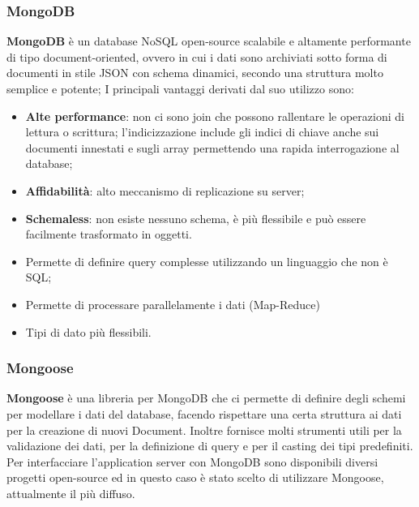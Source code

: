 \subsubsection{MongoDB}
\textbf{MongoDB} è un database NoSQL open-source scalabile e altamente performante di tipo document-oriented, ovvero in cui i dati sono archiviati sotto forma di documenti in stile JSON con schema dinamici, secondo una struttura molto semplice e potente;
I principali vantaggi derivati dal suo utilizzo sono:
\begin{itemize}
	\item \textbf{Alte performance}: non ci sono join che possono rallentare le operazioni di lettura o scrittura; l’indicizzazione include gli indici di chiave anche sui documenti innestati e sugli array permettendo una rapida interrogazione al database;
	\item \textbf{Affidabilità}: alto meccanismo di replicazione su server;
	\item \textbf{Schemaless}: non esiste nessuno schema, è più flessibile e può essere facilmente trasformato in oggetti.	
	\item Permette di definire query complesse utilizzando un linguaggio che non è SQL;
	\item Permette di processare parallelamente i dati (Map-Reduce)
	\item Tipi di dato più flessibili.
\end{itemize}

\subsubsection{Mongoose}
\textbf{Mongoose} è una libreria per MongoDB che ci permette di definire degli schemi per modellare i dati del database, facendo rispettare una certa struttura ai dati per la creazione di nuovi Document. Inoltre fornisce molti strumenti utili per la validazione dei dati, per la definizione di query e per il casting dei tipi predefiniti. \newline
Per interfacciare l'application server con MongoDB sono disponibili diversi progetti open-source ed in questo caso è stato scelto di utilizzare Mongoose, attualmente il più diffuso.	